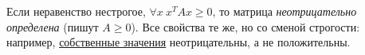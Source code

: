 

\begin{remark}
  Если неравенство нестрогое, $\forall x\ x^TAx \ge 0$, то матрица \emph{неотрицательно определена} (пишут $A \ge 0$). Все свойства те же, но со сменой строгости: например, \hyperref[note:025A8419-962C-4892-A4F8-FB496AAA938C]{собственные значения} неотрицательны, а не положительны.
\end{remark}
